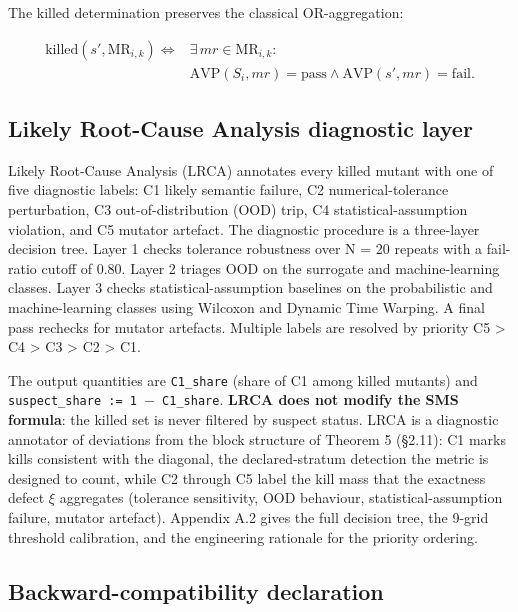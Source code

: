 \documentclass[manuscript,screen,review]{acmart}
\begin{document}
The killed determination preserves the classical OR-aggregation:

\[
\begin{aligned}
\mathrm{killed}(s', \mathrm{MR}_{i,k}) \iff{} & \exists\,mr \in \mathrm{MR}_{i,k}: \\
& \mathrm{AVP}(S_i, mr) = \text{pass} \wedge
  \mathrm{AVP}(s', mr) = \text{fail}.
\end{aligned}
\]

\subsection{Likely Root-Cause Analysis diagnostic layer}\label{lrca-engineering-attribution-layer-descriptive-not-in-sms}

Likely Root-Cause Analysis (LRCA) annotates every killed mutant with one
of five diagnostic labels: C1 likely semantic failure, C2
numerical-tolerance perturbation, C3 out-of-distribution (OOD) trip, C4
statistical-assumption violation, and C5 mutator artefact. The diagnostic
procedure is a three-layer decision tree.
Layer 1 checks tolerance robustness over N = 20 repeats with a
fail-ratio cutoff of 0.80. Layer 2 triages OOD on the surrogate and
machine-learning classes. Layer 3 checks statistical-assumption
baselines on the probabilistic and machine-learning classes using
Wilcoxon and Dynamic Time Warping. A final pass rechecks for mutator
artefacts. Multiple labels are resolved by priority C5 \textgreater{} C4
\textgreater{} C3 \textgreater{} C2 \textgreater{} C1.

The output quantities are \texttt{C1\_share} (share of C1 among killed
mutants) and \texttt{suspect\_share\ :=\ 1\ $-$\ C1\_share}. \textbf{LRCA
does not modify the SMS formula}: the killed set is never filtered by
suspect status. LRCA is a diagnostic annotator of deviations from the
block structure of Theorem 5 (§2.11): C1 marks kills consistent with the
diagonal, the declared-stratum detection the metric is designed to
count, while C2 through C5 label the kill mass that the exactness defect
$\xi$ aggregates (tolerance sensitivity, OOD behaviour,
statistical-assumption failure, mutator artefact). Appendix A.2 gives the full decision tree, the 9-grid
threshold calibration, and the engineering rationale for the priority
ordering.

\subsection{Backward-compatibility declaration}\label{backward-compatibility-declaration}
\end{document}
